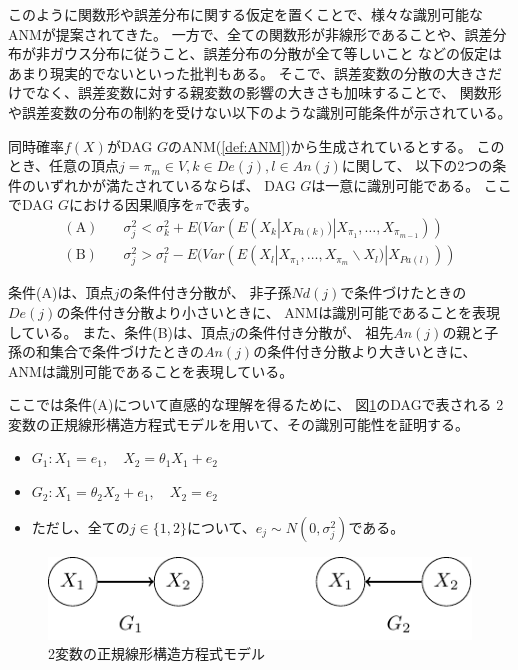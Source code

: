 このように関数形や誤差分布に関する仮定を置くことで、様々な識別可能なANMが提案されてきた。
一方で、全ての関数形が非線形であることや、誤差分布が非ガウス分布に従うこと、誤差分布の分散が全て等しいこと
などの仮定はあまり現実的でないといった批判もある。
そこで、誤差変数の分散の大きさだけでなく、誤差変数に対する親変数の影響の大きさも加味することで、
関数形や誤差変数の分布の制約を受けない以下のような識別可能条件が示されている\cite{Park2020-ey}。

\begin{theo}
  同時確率$f(X)$がDAG $G$のANM(\ref{def:ANM})から生成されているとする。
  このとき、任意の頂点$j = \pi_m \in V, k \in De(j), l \in An(j)$に関して、
  以下の2つの条件のいずれかが満たされているならば、
  DAG $G$は一意に識別可能である。
  ここでDAG $G$における因果順序を$\pi$で表す。
  \begin{align*}
    (\text{A}) \quad &\sigma_j^2 < \sigma_k^2 + E(\mathit{Var}(E(X_k | X_{Pa(k)}) | X_{\pi_1}, \dots, X_{\pi_{m-1}})) \\
    (\text{B}) \quad &\sigma_j^2 > \sigma_l^2 - E(\mathit{Var}(E(X_l | X_{\pi_1}, \dots, X_{\pi_m} \backslash X_l) | X_{Pa(l)}))
  \end{align*}
\end{theo}

条件(A)は、頂点$j$の条件付き分散が、
非子孫$Nd(j)$で条件づけたときの$De(j)$の条件付き分散より小さいときに、
ANMは識別可能であることを表現している。
また、条件(B)は、頂点$j$の条件付き分散が、
祖先$An(j)$の親と子孫の和集合で条件づけたときの$An(j)$の条件付き分散より大きいときに、
ANMは識別可能であることを表現している。

ここでは条件(A)について直感的な理解を得るために、
図\ref{fig:ex_bivariate_SEM}のDAGで表される
2変数の正規線形構造方程式モデルを用いて、その識別可能性を証明する。

\begin{itemize}
  \item
  $G_1 \colon X_1 = e_1,
   \quad X_2 = \theta_1 X_1 + e_2$

  \item
  $G_2 \colon X_1 = \theta_2 X_2 + e_1,
   \quad X_2 = e_2$

  \item
  ただし、全ての$j \in \{ 1,2 \}$について、$e_j \sim N(0, \sigma_j^2)$である。
\end{itemize}

\begin{figure}[h]
  \centering
  \includegraphics{./picture/bivariate_SEM.pdf}
  \caption{2変数の正規線形構造方程式モデル}
  \label{fig:ex_bivariate_SEM}
\end{figure}

